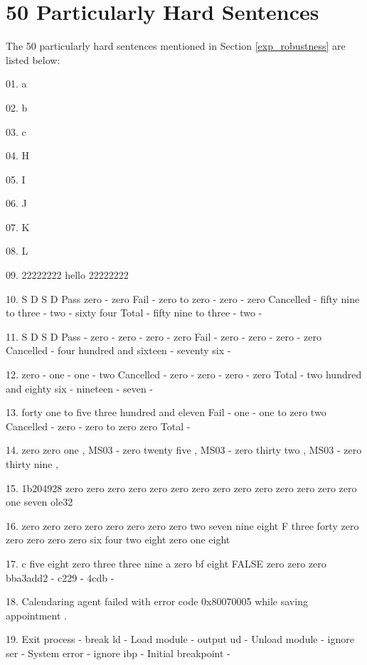 \documentclass{article}
\begin{document}
\section{50 Particularly Hard Sentences}
The 50 particularly hard sentences mentioned in Section \ref{exp_robustness} are listed below:

\hspace*{\fill}
{
\setlength{\parskip}{0.2em}

\begin{hangparas}{1.6em}{1}
01. a \par
02. b \par
03. c \par
04. H \par
05. I \par
06. J \par
07. K \par
08. L \par
09. 22222222 hello 22222222 \par
10. S D S D Pass zero - zero Fail - zero to zero - zero - zero Cancelled - fifty nine to three - two - sixty four Total - fifty nine to three - two - \par
11. S D S D Pass - zero - zero - zero - zero Fail - zero - zero - zero - zero Cancelled - four hundred and sixteen - seventy six - \par
12. zero - one - one - two Cancelled - zero - zero - zero - zero Total - two hundred and eighty six - nineteen - seven - \par
13. forty one to five three hundred and eleven Fail - one - one to zero two Cancelled - zero - zero to zero zero Total - \par
14. zero zero one , MS03 - zero twenty five , MS03 - zero thirty two , MS03 - zero thirty nine , \par
15. 1b204928 zero zero zero zero zero zero zero zero zero zero zero zero zero zero one seven ole32 \par
16. zero zero zero zero zero zero zero zero two seven nine eight F three forty zero zero zero zero zero six four two eight zero one eight \par
17. c five eight zero three three nine a zero bf eight FALSE zero zero zero bba3add2 - c229 - 4cdb - \par
18. Calendaring agent failed with error code 0x80070005 while saving appointment . \par
19. Exit process - break ld - Load module - output ud - Unload module - ignore ser - System error - ignore ibp - Initial breakpoint - \par

\end{hangparas}}
\end{document}
